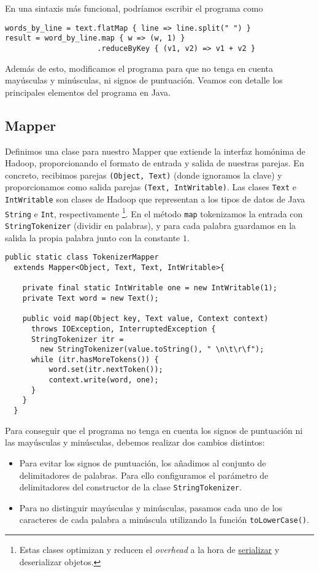\documentclass[11pt]{article}
\begin{document}
En una sintaxis más funcional, podríamos escribir el programa como

\begin{verbatim}
words_by_line = text.flatMap { line => line.split(" ") }
result = word_by_line.map { w => (w, 1) }
                     .reduceByKey { (v1, v2) => v1 + v2 }
\end{verbatim}

Además de esto, modificamos el programa para que no tenga en cuenta mayúsculas y minúsculas, ni signos de puntuación. Veamos con detalle los principales elementos del programa en Java.

\subsection*{Mapper}

Definimos una clase para nuestro Mapper que extiende la interfaz homónima de Hadoop, proporcionando el formato de entrada y salida de nuestras parejas. En concreto, recibimos parejas \verb|(Object, Text)| (donde ignoramos la clave) y proporcionamos como salida parejas \verb|(Text, IntWritable)|. Las clases \verb|Text| e \verb|IntWritable| son clases de Hadoop que representan a los tipos de datos de Java \verb|String| e \verb|Int|, respectivamente \footnote{Estas clases optimizan y reducen el \textit{overhead} a la hora de \href{https://en.wikipedia.org/wiki/Serialization}{serializar} y deserializar objetos.}. En el método \verb|map| tokenizamos la entrada con \verb|StringTokenizer| (dividir en palabras), y para cada palabra guardamos en la salida la propia palabra junto con la constante $1$.

\begin{verbatim}
public static class TokenizerMapper
  extends Mapper<Object, Text, Text, IntWritable>{

    private final static IntWritable one = new IntWritable(1);
    private Text word = new Text();

    public void map(Object key, Text value, Context context)
      throws IOException, InterruptedException {
      StringTokenizer itr =
        new StringTokenizer(value.toString(), " \n\t\r\f");
      while (itr.hasMoreTokens()) {
          word.set(itr.nextToken());
          context.write(word, one);
      }
    }
  }
\end{verbatim}

Para conseguir que el programa no tenga en cuenta los signos de puntuación ni las mayúsculas y minúsculas, debemos realizar dos cambios distintos:
\begin{itemize}
  \item Para evitar los signos de puntuación, los añadimos al conjunto de delimitadores de palabras. Para ello configuramos el parámetro de delimitadores del constructor de la clase \texttt{StringTokenizer}.
  \item Para no distinguir mayúsculas y minúsculas, pasamos cada uno de los caracteres de cada palabra a minúscula utilizando la función \texttt{toLowerCase()}.
\end{itemize}
\end{document}
